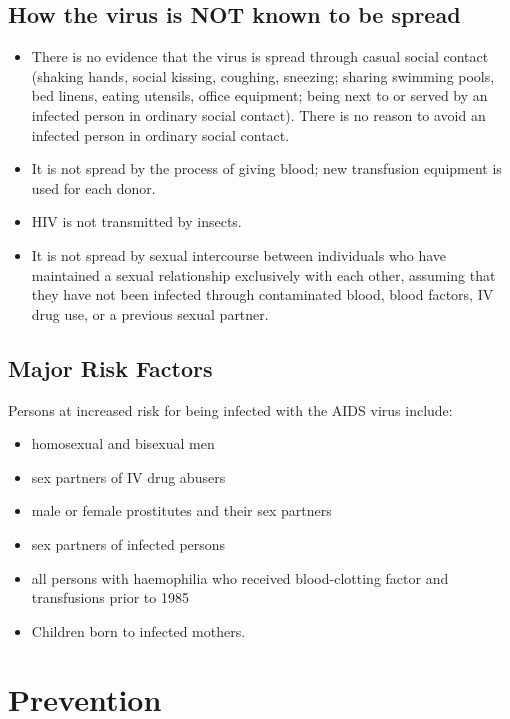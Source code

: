 \subsection{How the virus is NOT known to be spread}

\begin{itemize}
\item There is no evidence that the virus is spread through casual social contact (shaking
hands, social kissing, coughing, sneezing; sharing swimming pools, bed linens, eating
utensils, office equipment; being next to or served by an infected person in ordinary social
contact). There is no reason to avoid an infected person in ordinary social contact.
\item It is not spread by the process of giving blood; new transfusion equipment is used for
each donor.
\item HIV is not transmitted by insects.
\item It is not spread by sexual intercourse between individuals who have maintained a sexual
relationship exclusively with each other, assuming that they have not been infected
through contaminated blood, blood factors, IV drug use, or a previous sexual partner.
\end{itemize}

\subsection{Major Risk Factors}

Persons at increased risk for being infected with the AIDS virus include:

\begin{itemize}
\item homosexual and bisexual men
\item sex partners of IV drug abusers
\item male or female prostitutes and their sex partners
\item sex partners of infected persons
\item all persons with haemophilia who received blood-clotting factor and transfusions prior to
1985
\item Children born to infected mothers.
\end{itemize}

\section{Prevention}

